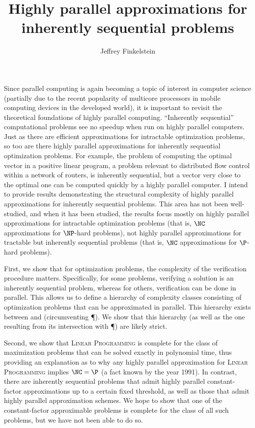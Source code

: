\documentclass{article}
\author{Jeffrey Finkelstein}
\title{Highly parallel approximations for inherently sequential problems}
\begin{document}
\maketitle


Since parallel computing is again becoming a topic of interest in computer science (partially due to the recent popularity of multicore processors in mobile computing devices in the developed world), it is important to revisit the theoretical foundations of highly parallel computing.
``Inherently sequential'' computational problems see no speedup when run on highly parallel computers.
Just as there are efficient approximations for intractable optimization problems, so too are there highly parallel approximations for inherently sequential optimization problems.
For example, the problem of computing the optimal vector in a positive linear program, a problem relevant to distributed flow control within a network of routers, is inherently sequential, but a vector very close to the optimal one can be computed quickly by a highly parallel computer.
I intend to provide results demonstrating the structural complexity of highly parallel approximations for inherently sequential problems.
This area has not been well-studied, and when it has been studied, the results focus mostly on highly parallel approximations for intractable optimization problems (that is, $\NC$ approximations for $\NP$-hard problems), not highly parallel approximations for tractable but inherently sequential problems (that is, $\NC$ approximations for $\P$-hard problems).


First, we show that for optimization problems, the complexity of the verification procedure matters.
Specifically, for some problems, verifying a solution is an inherently sequential problem, whereas for others, verification can be done in parallel.
This allows us to define a hierarchy of complexity classes consisting of optimization problems that can be approximated in parallel.
This hierarchy exists between \NC{} and \NP{} (circumventing \P).
We show that this hierarchy (as well as the one resulting from its intersection with \P) are likely strict.

Second, we show that \textsc{Linear Programming} is complete for the class of maximization problems that can be solved exactly in polynomial time, thus providing an explanation as to why any highly parallel approximation for \textsc{Linear Programming} implies $\NC = \P$ (a fact known by the year 1991).
In contrast, there are inherently sequential problems that admit highly parallel constant-factor approximations up to a certain fixed threshold, as well as those that admit highly parallel approximation schemes.
We hope to show that one of the constant-factor approximable problems is complete for the class of all such problems, but we have not been able to do so.
\end{document}
